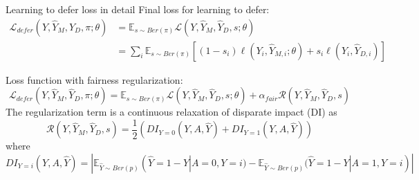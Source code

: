 \documentclass[11pt]{beamer}
\begin{document}
\begin{frame}{Learning to defer loss in detail}
\small
Final loss for learning to defer:
\begin{equation*}
\begin{split}
   \mathcal{L}_{defer}(Y,\hat{Y}_M, \hat{Y}_D, \pi; \theta)  
   & = \mathbb{E}_{s \sim Ber(\pi)} \mathcal{L}(Y,\hat{Y}_M, \hat{Y}_D, s; \theta) \\
   & = \sum\limits_i \mathbb{E}_{s \sim Ber(\pi)} [(1-s_i) \ell(Y_i, \hat{Y}_{M,i}; \theta) + s_i \ell(Y_i, \hat{Y}_{D,i})]
\end{split}
\end{equation*}

Loss function with fairness regularization:
\begin{equation*}
    \mathcal{L}_{defer}(Y,\hat{Y}_M, \hat{Y}_D, \pi; \theta) = \mathbb{E}_{s \sim Ber(\pi)} \mathcal{L}(Y,\hat{Y}_M, \hat{Y}_D, s; \theta) + \alpha_{fair} \mathcal{R}(Y, \hat{Y}_M, \hat{Y}_D, s)
\end{equation*}
The regularization term is a continuous relaxation of disparate impact (DI) as
\begin{equation*}
    \mathcal{R}(Y, \hat{Y}_M, \hat{Y}_D, s) = \frac{1}{2} (DI_{Y=0}(Y,A,\hat{Y}) + DI_{Y=1}(Y,A,\hat{Y}))
\end{equation*}
where
\scriptsize{
\begin{equation*}
    DI_{Y=i}(Y,A,\hat{Y}) = | \mathbb{E}_{\hat{Y}\sim Ber(p)} (\hat{Y}=1-Y|A=0,Y=i) - \mathbb{E}_{\hat{Y}\sim Ber(p)} (\hat{Y}=1-Y|A=1,Y=i) |
\end{equation*}
}
\end{frame}
\end{document}
